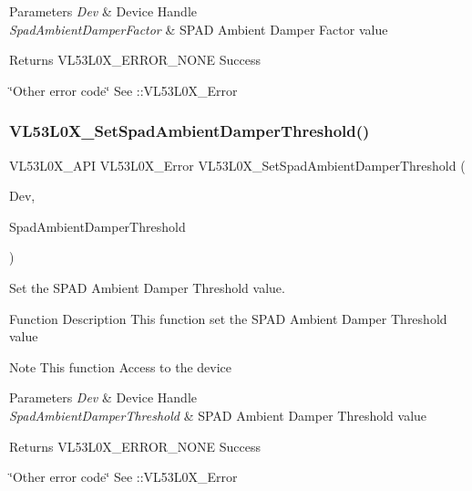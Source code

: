 \begin{DoxyParams}{Parameters}
{\em Dev} & Device Handle \\
\hline
{\em Spad\+Ambient\+Damper\+Factor} & S\+P\+AD Ambient Damper Factor value \\
\hline
\end{DoxyParams}
\begin{DoxyReturn}{Returns}
V\+L53\+L0\+X\+\_\+\+E\+R\+R\+O\+R\+\_\+\+N\+O\+NE Success 

\char`\"{}\+Other error code\char`\"{} See \+::\+V\+L53\+L0\+X\+\_\+\+Error 
\end{DoxyReturn}
\mbox{\label{group__VL53L0X__SPADfunctions__group_ga989a7fd1772142cc2d4d63d6f3d0fb7e}} 
\subsubsection{\texorpdfstring{V\+L53\+L0\+X\+\_\+\+Set\+Spad\+Ambient\+Damper\+Threshold()}{VL53L0X\_SetSpadAmbientDamperThreshold()}}
{\footnotesize\ttfamily V\+L53\+L0\+X\+\_\+\+A\+PI V\+L53\+L0\+X\+\_\+\+Error V\+L53\+L0\+X\+\_\+\+Set\+Spad\+Ambient\+Damper\+Threshold (\begin{DoxyParamCaption}\item[{\hyperlink{group__VL53L0X__platform__group_ga2d6405308b1dd524b462f1b8fb97d167}{V\+L53\+L0\+X\+\_\+\+D\+EV}}]{Dev,  }\item[{\hyperlink{vl53l0x__types_8h_a273cf69d639a59973b6019625df33e30}{uint16\+\_\+t}}]{Spad\+Ambient\+Damper\+Threshold }\end{DoxyParamCaption})}



Set the S\+P\+AD Ambient Damper Threshold value. 

\begin{DoxyParagraph}{Function Description}
This function set the S\+P\+AD Ambient Damper Threshold value
\end{DoxyParagraph}
\begin{DoxyNote}{Note}
This function Access to the device
\end{DoxyNote}

\begin{DoxyParams}{Parameters}
{\em Dev} & Device Handle \\
\hline
{\em Spad\+Ambient\+Damper\+Threshold} & S\+P\+AD Ambient Damper Threshold value \\
\hline
\end{DoxyParams}
\begin{DoxyReturn}{Returns}
V\+L53\+L0\+X\+\_\+\+E\+R\+R\+O\+R\+\_\+\+N\+O\+NE Success 

\char`\"{}\+Other error code\char`\"{} See \+::\+V\+L53\+L0\+X\+\_\+\+Error 
\end{DoxyReturn}
